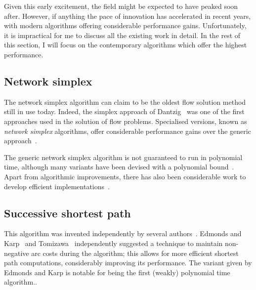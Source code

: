 Given this early excitement, the field might be expected to have peaked soon after. However, if anything the pace of innovation has accelerated in recent years, with modern algorithms offering considerable performance gains. Unfortunately, it is impractical for me to discuss all the existing work in detail. In the rest of this section, I will focus on the contemporary algorithms which offer the highest performance.

\subsection{Network simplex}

The network simplex algorithm can claim to be the oldest flow solution method still in use today. Indeed, the simplex approach of Dantzig~\cite{Dantzig:1949} was one of the first approaches used in the solution of flow problems. Specialised versions, known as \emph{network simplex} algorithms, offer considerable performance gains over the generic approach~\cite{Dantzig:1962}.

The generic network simplex algorithm is not guaranteed to run in polynomial time\footnotemark, although many variants have been devised with a polynomial bound~\cite{Tarjan:1991,Goldfarb:1992}. Apart from algorithmic improvements, there has also been considerable work to develop efficient implementations~\cite{Lobel:1996,Grigoriadis:1986}.

\subsection{Successive shortest path} \label{sec:intro-related-work-ssp}

This algorithm was invented independently by several authors~\cite{Jewell:1958,Iri:1960,BusackerGowen:1960}. Edmonds and Karp~\cite{Edmonds:1972} and Tomizawa~\cite{Tomizawa:1971} independently suggested a technique to maintain non-negative arc costs during the algorithm; this allows for more efficient shortest path computations, considerably improving its performance. The variant given by Edmonds and Karp is notable for being the first (weakly) polynomial time algorithm.\footnotemark.


